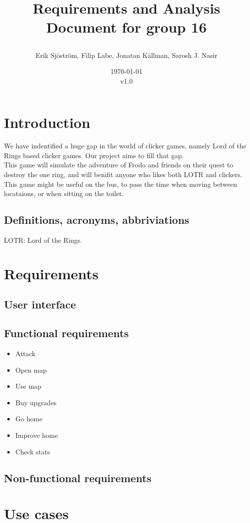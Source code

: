 \documentclass{article}
\title{
    Requirements and Analysis Document for group 16
    \author{Erik Sjöström,
            Filip Labe,
            Jonatan Källman,
            Sarosh J. Nasir}
    \date{\today \\v1.0}         
}
\begin{document}
\maketitle

\section{Introduction}
We have indentified a huge gap in the world of clicker games, namely 
Lord of the Rings based clicker games. Our project aims to fill that gap. \\
This game will simulate the adventure of Frodo and friends on their quest to
destroy the one ring, and will benifit anyone who likes both LOTR and clickers.\\
This game might be useful on the bus, to pass the time when moving between locataions, or when sitting on the toilet. 

\subsection{Definitions, acronyms, abbriviations}
LOTR: Lord of the Rings.

\section{Requirements}
\subsection{User interface}
\subsection{Functional requirements}
\begin{itemize}
    \item Attack
    \item Open map
    \item Use map
    \item Buy upgrades
    \item Go home
    \item Improve home
    \item Check stats
\end{itemize}
\subsection{Non-functional requirements}

\section{Use cases}
\end{document}
